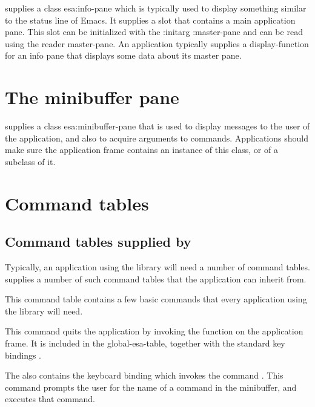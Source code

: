 \sysname{} supplies a class esa:info-pane which is typically used to display
something similar to the status line of Emacs.  It supplies a slot
that contains a main application pane.  This slot can be initialized
with the :initarg :master-pane and can be read using the reader
master-pane.  An application typically supplies a \clim{}
display-function for an info pane that displays some data about its 
master pane. 

\section{The minibuffer pane}

\sysname{} supplies a class esa:minibuffer-pane that is used to display
messages to the user of the application, and also to acquire arguments
to commands.  Applications should make sure the application frame
contains an instance of this class, or of a subclass of it.  

\section{Command tables}

\subsection{Command tables supplied by \sysname{}}

Typically, an application using the \sysname{} library will need a number of
\clim{} command tables.  \sysname{} supplies a number of such command tables
that the application can inherit from.  


This command table contains a few basic commands that every
application using the \sysname{} library will need.

 {}

This command quits the application by invoking the \clim{} function
 on the application frame.  It is included in the
global-esa-table, together with the standard key bindings .

The  also contains the keyboard binding
 which invokes the command .  This
command prompts the user for the name of a command in the minibuffer,
and executes that command.


